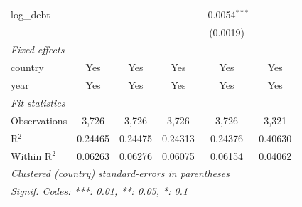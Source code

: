 \begin{tabular}{lccccc}
   log\_debt          &                 &                 &                 & -0.0054$^{***}$ &   \\   
                      &                 &                 &                 & (0.0019)        &   \\   
   \midrule
   \emph{Fixed-effects}\\
   country            & Yes             & Yes             & Yes             & Yes             & Yes\\  
   year               & Yes             & Yes             & Yes             & Yes             & Yes\\  
   \midrule
   \emph{Fit statistics}\\
   Observations       & 3,726           & 3,726           & 3,726           & 3,726           & 3,321\\  
   R$^2$              & 0.24465         & 0.24475         & 0.24313         & 0.24376         & 0.40630\\  
   Within R$^2$       & 0.06263         & 0.06276         & 0.06075         & 0.06154         & 0.04062\\  
   \midrule \midrule
   \multicolumn{6}{l}{\emph{Clustered (country) standard-errors in parentheses}}\\
   \multicolumn{6}{l}{\emph{Signif. Codes: ***: 0.01, **: 0.05, *: 0.1}}\\
\end{tabular}
\par\endgroup


